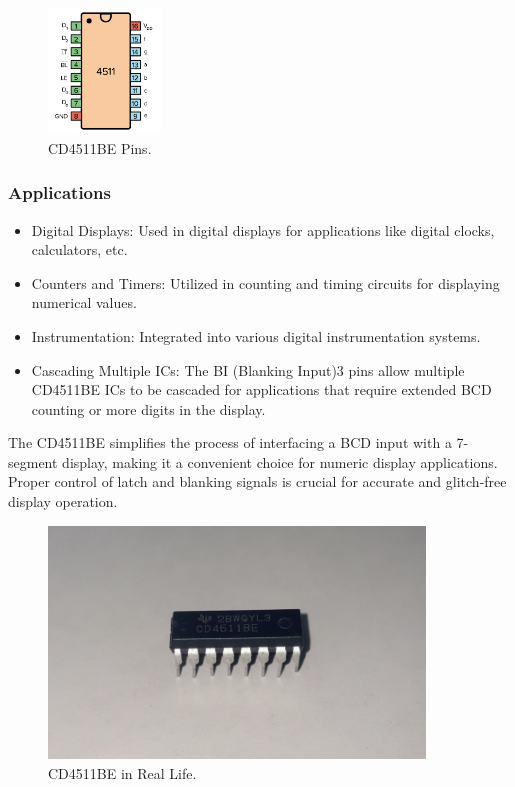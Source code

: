 \documentclass{article}
\begin{document}
\begin{figure}[h]
    \centering
    \includegraphics[width=3cm]{Pic/Pictures/4511 Pins.png}
    \caption{CD4511BE Pins.}
    \label{fig:enter-label}
\end{figure}

\subsubsection{Applications}
\begin{itemize}
    \item Digital Displays: Used in digital displays for applications like digital clocks, calculators, etc.
    \item Counters and Timers: Utilized in counting and timing circuits for displaying numerical values.
    \item Instrumentation: Integrated into various digital instrumentation systems.
    \item Cascading Multiple ICs: The BI (Blanking Input)3 pins allow multiple CD4511BE ICs to be cascaded for applications that require extended BCD counting or more digits in the display.
\end{itemize}


The CD4511BE simplifies the process of interfacing a BCD input with a 7-segment display, making it a convenient choice for numeric display applications. Proper control of latch and blanking signals is crucial for accurate and glitch-free display operation.

\begin{figure}[h]
    \centering
    \includegraphics[width=10cm]{Pic/Pictures/4511 real.jpg}
    \caption{CD4511BE in Real Life.}
    \label{fig:enter-label}
\end{figure}
\newpage
\end{document}
